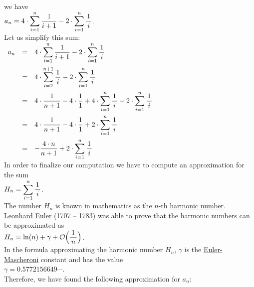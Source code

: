we have
\\[0.2cm]
\hspace*{1.3cm}
$\displaystyle a_{n} = 4 \cdot \sum\limits_{i=1}^n \frac{1}{i+1} - 2 \cdot \sum\limits_{i=1}^n \frac{1}{\,i\,}$.  
\\[0.2cm]
Let us simplify this sum:
\\[0.2cm]
\hspace*{1.3cm}
$
\begin{array}{lcl}
 a_{n} & = & \displaystyle 4 \cdot \sum_{i=1}^n \frac{1}{i+1} - 2 \cdot \sum_{i=1}^n \frac{1}{\,i\,} \\[0.5cm]
       & = & \displaystyle 4 \cdot \sum_{i=2}^{n+1} \frac{1}{\,i\,} - 2 \cdot \sum_{i=1}^n \frac{1}{\,i\,} \\[0.5cm]
       & = & \displaystyle 4 \cdot \frac{1}{n+1} - 4 \cdot \frac{1}{1} + 4 \cdot \sum_{i=1}^{n} \frac{1}{\,i\,} - 2 \cdot \sum_{i=1}^n \frac{1}{\,i\,} \\[0.5cm]
       & = & \displaystyle 4 \cdot \frac{1}{n+1} - 4 \cdot \frac{1}{1} + 2 \cdot \sum_{i=1}^{n} \frac{1}{\,i\,}  \\[0.5cm]
       & = & \displaystyle - \frac{4 \cdot n}{n+1}  + 2 \cdot \sum_{i=1}^{n} \frac{1}{\,i\,}  
\end{array}
$
\\[0.2cm]
In order to finalize our computation we have to compute an approximation for the sum
\\[0.2cm]
\hspace*{1.3cm}
$H_n = \displaystyle\sum\limits_{i=1}^{n}\frac{1}{\,i\,}$.
\\[0.2cm] 
The number $H_n$ is known in mathematics as the $n$-th 
\href{http://en.wikipedia.org/wiki/Harmonic_number}{harmonic number}.
\href{http://en.wikipedia.org/wiki/Leonhard_Euler}{Leonhard Euler} (1707 -- 1783) was able to prove
that the harmonic numbers can be approximated as
\\[0.2cm]
\hspace*{1.3cm}
$\displaystyle H_n = \ln(n) + \gamma + \mathcal{O}\Bigl(\frac{1}{\,n\,}\Bigr)$. 
\\[0.2cm] 
In the formula approximating the harmonic number $H_n$, $\gamma$ is the
\href{http://en.wikipedia.org/wiki/Euler-Mascheroni_constant}{Euler-Mascheroni} constant and has the 
value
\\[0.2cm]
\hspace*{1.3cm}
$\gamma = 0.5772156649 \cdots$.
\\[0.2cm]
Therefore, we have found the following approximation for $a_n$:
\\[0.2cm]
\hspace*{1.3cm}

